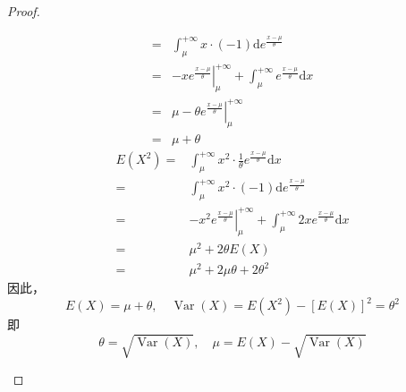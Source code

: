 \documentclass[normal,founder,mtpro2,cn]{elegantnote}
\begin{document}
\begin{enumerate}
\begin{proof}
\begin{enumerate}
\begin{equation*}
\begin{aligned}
                              =     & \int_{\mu}^{+\infty}x\cdot(-1)\mathrm{d}e^{\frac{x-\mu}{\theta}}                                                \\
                              =     & -\left.xe^{\frac{x-\mu}{\theta}}\right|_{\mu}^{+\infty}+\int_{\mu}^{+\infty}e^{\frac{x-\mu}{\theta}}\mathrm{d}x \\
                              =     & \mu-\left.\theta e^{\frac{x-\mu}{\theta}}\right|_{\mu}^{+\infty}                                                \\
                              =     & \mu+\theta
                          \end{aligned}
                      \end{equation*}
                      \begin{equation*}
                          \begin{aligned}
                              E\left(X^{2}\right)  = & \int_{\mu}^{+\infty}x^{2}\cdot\frac{1}{\theta}e^{\frac{x-\mu}{\theta}}\mathrm{d}x                                     \\
                              =                      & \int_{\mu}^{+\infty}x^{2}\cdot(-1)\mathrm{d}e^{\frac{x-\mu}{\theta}}                                                  \\
                              =                      & -\left.x^{2}e^{\frac{x-\mu}{\theta}}\right|_{\mu}^{+\infty}+\int_{\mu}^{+\infty}2xe^{\frac{x-\mu}{\theta}}\mathrm{d}x \\
                              =                      & \mu^{2}+2\theta E(X)                                                                                                  \\
                              =                      & \mu^{2}+2\mu\theta+2\theta^{2}
                          \end{aligned}
                      \end{equation*}
                      因此，
                      \begin{equation*}
                          E(X)=\mu+\theta,\quad\operatorname{Var}(X)=E\left(X^{2}\right)-[E(X)]^{2}=\theta^{2}
                      \end{equation*}
                      即
                      \begin{equation*}
                          \theta=\sqrt{\operatorname{Var}(X)},\quad\mu=E(X)-\sqrt{\operatorname{Var}(X)}
                      \end{equation*}

\end{enumerate}
\end{proof}
\end{enumerate}
\end{document}
